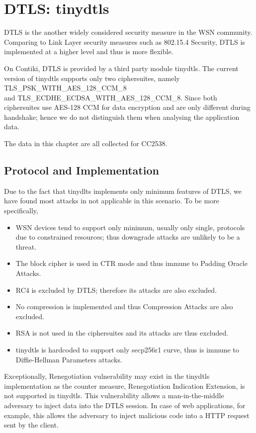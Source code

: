 \chapter{DTLS: tinydtls} \label{Chp: DTLS}

DTLS is the another widely considered security measure in the WSN community. Comparing to Link Layer security measures such as 802.15.4 Security, DTLS is implemented at a higher level and thus is more flexible. 

On Contiki, DTLS is provided by a third party module tinydtls. The current version of tinydtls supports only two ciphersuites, namely TLS\_PSK\_WITH\_AES\_128\_CCM\_8 \\
and TLS\_ECDHE\_ECDSA\_WITH\_AES\_128\_CCM\_8. Since both ciphersuites use AES-128 CCM for data encryption and are only different during handshake; hence we do not distinguish them when analysing the application data\cite{TlsRenego}.

The data in this chapter are all collected for CC2538.

\section{Protocol and Implementation}

Due to the fact that tinydlts implements only minimum features of DTLS, we have found most attacks in \cite{rfc7457} not applicable in this scenario. To be more specifically,

\begin{itemize}
	\item WSN devices tend to support only minimum, usually only single, protocols due to constrained resources; thus downgrade attacks are unlikely to be a threat.
	\item The block cipher is used in CTR mode and thus immune to Padding Oracle Attacks.
	\item RC4 is excluded by DTLS; therefore its attacks are also excluded.
	\item No compression is implemented and thus Compression Attacks are also excluded.
	\item RSA is not used in the ciphersuites and its attacks are thus excluded.
	\item tinydtls is hardcoded to support only secp256r1 curve, thus is immune to Diffie-Hellman Parameters attacks.
\end{itemize}

Exceptionally, Renegotiation vulnerability\cite{rfc5746} may exist in the tinydtls implementation as the counter measure, Renegotiation Indication Extension, is not supported in tinydtls. This vulnerability allows a man-in-the-middle adversary to inject data into the DTLS session. In case of web applications, for example, this allows the adversary to inject malicious code into a HTTP request sent by the client\cite{TlsRenego}.

